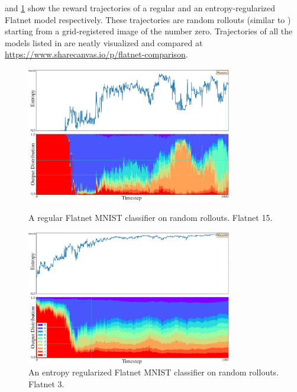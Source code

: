  and \ref{fig:flatnet-comparison} show the reward trajectories of a regular and an entropy-regularized Flatnet model respectively.
These trajectories are random rollouts (similar to ) starting from a grid-registered image of the number zero.
Trajectories of all the models listed in  are neatly visualized and compared at \url{https://www.sharecanvas.io/p/flatnet-comparison}.

\begin{figure}[H]
    \centering
    \includegraphics[width=0.8\textwidth]{images/Flatnet 15.pdf}
    \caption[A regular Flatnet MNIST classifier on random rollouts.]{A regular Flatnet MNIST classifier on random rollouts\footnotemark[1]. Flatnet 15.}
    \label{fig:flatnet-comparison-baseline}
    \vspace{12pt}
    \includegraphics[width=0.8\textwidth]{images/Flatnet 3.pdf}
    \caption[An entropy regularized Flatnet MNIST classifier on random rollouts.]{An entropy regularized Flatnet MNIST classifier on random rollouts\footnotemark[1]. Flatnet 3.}
    \label{fig:flatnet-comparison}
\end{figure}


